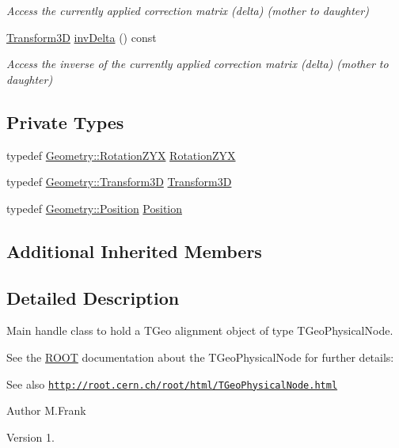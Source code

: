 \begin{DoxyCompactItemize}
\begin{DoxyCompactList}\small\item\em Access the currently applied correction matrix (delta) (mother to daughter) \end{DoxyCompactList}\item 
\hyperlink{class_d_d4hep_1_1_alignments_1_1_global_alignment_a328240cbc53ba92424336a5898ba49d3}{Transform3D} \hyperlink{class_d_d4hep_1_1_alignments_1_1_global_alignment_a8f16262db0af3dc12e6372fa02daf67b}{inv\+Delta} () const
\begin{DoxyCompactList}\small\item\em Access the inverse of the currently applied correction matrix (delta) (mother to daughter) \end{DoxyCompactList}\end{DoxyCompactItemize}
\subsection*{Private Types}
\begin{DoxyCompactItemize}
\item 
typedef \hyperlink{namespace_d_d4hep_1_1_geometry_a24667b2b9c3cec3d5239828db4d52189}{Geometry\+::\+Rotation\+Z\+YX} \hyperlink{class_d_d4hep_1_1_alignments_1_1_global_alignment_af30b8cf1e2dbdfb67f6819ef88e02478}{Rotation\+Z\+YX}
\item 
typedef \hyperlink{namespace_d_d4hep_1_1_geometry_aeb4c0356d12fd7be49a0aae50514e64b}{Geometry\+::\+Transform3D} \hyperlink{class_d_d4hep_1_1_alignments_1_1_global_alignment_a328240cbc53ba92424336a5898ba49d3}{Transform3D}
\item 
typedef \hyperlink{namespace_d_d4hep_1_1_geometry_a55083902099d03506c6db01b80404900}{Geometry\+::\+Position} \hyperlink{class_d_d4hep_1_1_alignments_1_1_global_alignment_a9cd5167ec3a33a95ca76a9c7fe06271e}{Position}
\end{DoxyCompactItemize}
\subsection*{Additional Inherited Members}


\subsection{Detailed Description}
Main handle class to hold a T\+Geo alignment object of type T\+Geo\+Physical\+Node. 

See the \hyperlink{namespace_r_o_o_t}{R\+O\+OT} documentation about the T\+Geo\+Physical\+Node for further details\+: \begin{DoxySeeAlso}{See also}
\href{http://root.cern.ch/root/html/TGeoPhysicalNode.html}{\tt http\+://root.\+cern.\+ch/root/html/\+T\+Geo\+Physical\+Node.\+html}
\end{DoxySeeAlso}
\begin{DoxyAuthor}{Author}
M.\+Frank 
\end{DoxyAuthor}
\begin{DoxyVersion}{Version}
1. 
\end{DoxyVersion}


